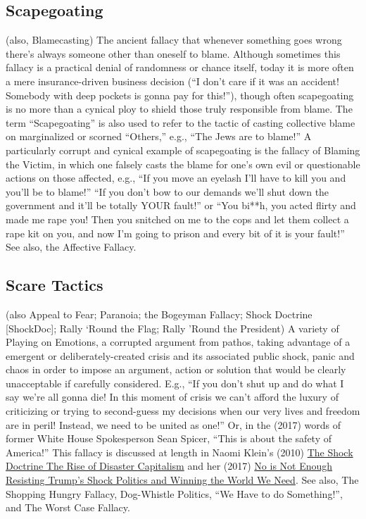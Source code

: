 \documentclass[10pt,a4paper,british]{article}
\begin{document}
\begin{multicols}{2}
	\subsection{Scapegoating} (also, Blamecasting) The ancient fallacy that
	whenever something goes wrong there's always someone other than oneself to
	blame. Although sometimes this fallacy is a practical denial of randomness
	or chance itself, today it is more often a mere insurance{-}driven business
	decision (``I don't care if it was an accident! Somebody with deep pockets
	is gonna pay for this!''), though often scapegoating is no more than a
	cynical ploy to shield those truly responsible from blame. The term
	``Scapegoating'' is also used to refer to the tactic of casting collective
	blame on marginalized or scorned ``Others,'' e.g., ``The Jews are to
	blame!'' A particularly corrupt and cynical example of scapegoating is the
	fallacy of Blaming the Victim, in which one falsely casts the blame for
	one's own evil or questionable actions on those affected, e.g., ``If you
	move an eyelash I'll have to kill you and you'll be to blame!'' ``If you
	don't bow to our demands we'll shut down the government and it'll be
	totally YOUR fault!'' or ``You bi**h, you acted flirty and made me rape
	you! Then you snitched on me to the cops and let them collect a rape kit on
	you, and now I'm going to prison and every bit of it is your fault!'' See
	also, the Affective Fallacy.

	\subsection{Scare Tactics} (also Appeal to Fear; Paranoia; the Bogeyman
	Fallacy; Shock Doctrine [ShockDoc]; Rally `Round the Flag; Rally 'Round the
	President) A variety of Playing on Emotions, a corrupted argument from
	pathos, taking advantage of a emergent or deliberately{-}created crisis and
	its associated public shock, panic and chaos in order to impose an
	argument, action or solution that would be clearly unacceptable if
	carefully considered. E.g., ``If you don't shut up and do what I say we're
	all gonna die! In this moment of crisis we can't afford the luxury of
	criticizing or trying to second{-}guess my decisions when our very lives
	and freedom are in peril!  Instead, we need to be united as one!'' Or, in
	the (2017) words of former White House Spokesperson Sean Spicer, ``This is
	about the safety of America!'' This fallacy is discussed at length in Naomi
	Klein's (2010)
	\href{https://www.amazon.com/Shock-Doctrine-Rise-Disaster-Capitalism/dp/080507983}{The
	Shock Doctrine The Rise of Disaster Capitalism} and her (2017)
	\href{https://www.amazon.com/No-Not-Enough-Resisting-Politics/dp/1608468909}{No
	is Not Enough Resisting Trump's Shock Politics and Winning the World We
	Need}. See also, The Shopping Hungry Fallacy, Dog{-}Whistle Politics, ``We
	Have to do Something!'', and The Worst Case Fallacy.


\end{multicols}
\end{document}
